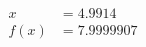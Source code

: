 \documentclass[preview]{standalone}
\begin{document}
\begin{align*}
x &= 4.9914\\f(x) &= 7.9999907
\end{align*}
\end{document}
